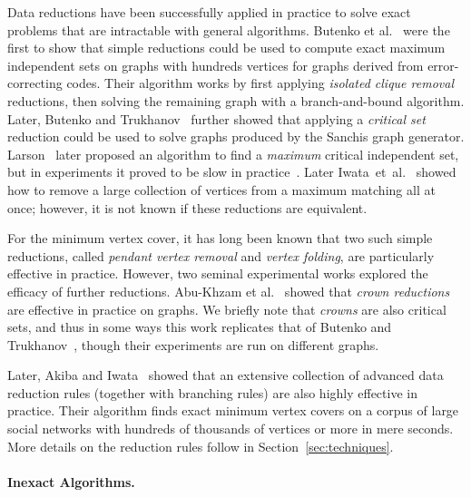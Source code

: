 \documentclass[twoside,leqno,twocolumn]{article}
\newcommand{\etal}{et~al.\xspace}
\begin{document}
Data reductions have been successfully applied in practice to solve exact problems that are intractable with general algorithms. Butenko et al.~\cite{butenko-2002} were the first to show that simple reductions could be used to compute exact maximum independent sets on graphs with hundreds vertices for graphs derived from error-correcting codes. Their algorithm works by first applying \emph{isolated clique removal} reductions, then solving the remaining graph with a branch-and-bound algorithm. Later, Butenko and Trukhanov~\cite{butenko-trukhanov} further showed that applying a \emph{critical set} reduction could be used to solve graphs produced by the Sanchis graph generator.
Larson~\cite{larson-2007} later proposed an algorithm to find a \emph{maximum} critical independent set, but in experiments it proved to be slow in practice~\cite{strash2016power}.
Later Iwata~\etal~\cite{iwata-2014} showed how to remove a large collection of vertices from a maximum matching all at once; however, it is not known if these reductions are equivalent.

For the minimum vertex cover, it has long been known that two such simple reductions, called \emph{pendant vertex removal} and \emph{vertex folding}, are particularly effective in practice. However, two seminal experimental works explored the efficacy of further reductions. Abu-Khzam et al.~\cite{abu-khzam-2007} showed that \emph{crown reductions} are effective in practice on  graphs. We briefly note that \emph{crowns} are also critical sets, and thus in some ways this work replicates that of Butenko and Trukhanov~\cite{butenko-trukhanov}, though their experiments are run on different graphs.



Later, Akiba and Iwata~\cite{akiba-tcs-2016} showed that an extensive collection of advanced data reduction rules (together with branching rules) are also highly effective in practice. Their algorithm finds exact minimum vertex covers on a corpus of large social networks with hundreds of thousands of vertices or more in mere seconds. More details on the reduction rules follow in Section~\ref{sec:techniques}.


\paragraph*{Inexact Algorithms.}
\end{document}
